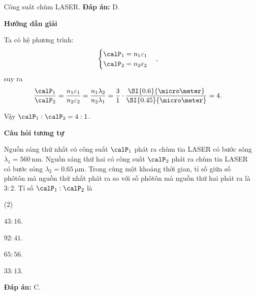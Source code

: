 \begin{dang}{Công suất chùm LASER.}
{\textbf{Đáp án:} D.
}
{\begin{center}
	\textbf{Hướng dẫn giải}
\end{center}

Ta có hệ phương trình:
\begin{equation*}\begin{cases}
	\calP_1 = n_1 \varepsilon_1 \\
	\calP_2 = n_2 \varepsilon_2
\end{cases},\end{equation*}
suy ra
\begin{equation*}
	\dfrac{\calP_1}{\calP_2} = \dfrac{n_1 \varepsilon_1}{n_2 \varepsilon_2} = \dfrac{n_1 \lambda_2}{n_2 \lambda_1} = \dfrac{3}{1} \cdot \dfrac{\SI{0.6}{\micro \meter}}{\SI{0.45}{\micro \meter}} = 4.
\end{equation*}

Vậy $\calP_1:\calP_2 = 4:1$.

\begin{center}
	\textbf{Câu hỏi tương tự}
\end{center}

Nguồn sáng thứ nhất có công suất $\calP_1$ phát ra chùm tia LASER có bước sóng $\lambda_1 = \SI{560}{\nano \meter}$. Nguồn sáng thứ hai có công suất $\calP_2$ phát ra chùm tia LASER có bước sóng $\lambda_2 = \SI{0.65}{\micro \meter}$. Trong cùng một khoảng thời gian, tỉ số giữa số phôtôn mà nguồn thứ nhất phát ra so với số phôtôn mà nguồn thứ hai phát ra là $3:2$. Tỉ số $\calP_1:\calP_2$ là 
\begin{mcq}(2)
	\item $43:16$.
	\item $92:41$.
	\item $65:56$.
	\item $33:13$.
\end{mcq}

\textbf{Đáp án:} C.}

\end{dang}

